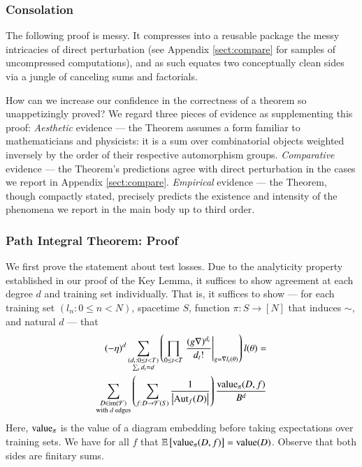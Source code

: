 \documentclass{article}
\newcommand{\Free}{\mathcal{F}}
\newcommand{\Aut}{\text{\textnormal{Aut}}}
\newcommand{\image}{\text{\textnormal{im}}}
\newcommand{\dvalue}{\text{\textnormal{value}}}
\newcommand{\expct}[1]{\mathbb{E}\left[#1\right]}
\newcommand{\wrap}[1]{\left(#1\right)}
\newcommand{\wabs}[1]{\left|#1\right|}
\begin{document}
        \subsubsection*{Consolation}
            The following proof is messy.  It compresses into a reusable
            package the messy intricacies of direct perturbation (see
            Appendix \ref{sect:compare} for samples of uncompressed computations), and as such 
            equates two conceptually clean sides via a jungle of canceling
            sums and factorials.  

            How can we increase our confidence in the correctness of a theorem
            so unappetizingly proved?  We regard three pieces of evidence as
            supplementing this proof: \emph{Aesthetic} evidence --- the Theorem
            assumes a form familiar to mathematicians and physicists: it is a
            sum over combinatorial objects weighted inversely by the order of
            their respective automorphism groups.  \emph{Comparative}
            evidence --- the Theorem's predictions agree with direct
            perturbation in the cases we report in Appendix \ref{sect:compare}.
            \emph{Empirical} evidence --- the Theorem, though compactly stated,
            precisely predicts the existence and intensity of the phenomena we
            report in the main body up to third order.
 
        \subsubsection*{Path Integral Theorem: Proof}
            We first prove the statement about test losses.
            Due to the analyticity property established in our proof of the
            Key Lemma, it suffices to show agreement at each degree $d$ and
            training set individually.  That is, it suffices to show --- for
            each training set $(l_n: 0\leq n<N)$, spacetime $S$, function $\pi:
            S\to [N]$ that induces $\sim$, and natural $d$ --- that
            \begin{align} \label{eq:toprove}
                (-\eta)^d
                \sum_{\substack{
                    (d_t: 0\leq t<T) \\
                    \sum_t d_t = d
                }}
                \wrap{
                    \prod_{0 \leq t < T} \left.
                        \frac{(g \nabla)^{d_t}}{d_t!}
                    \right|_{g=\nabla l_t(\theta)}
                } l (\theta)
                = \nonumber \\
                \sum_{\substack{
                    D \in \image(\Free) \\
                    \textnormal{with $d$ edges}
                }}
                \wrap{
                    \sum_{f: D\to\Free(S)}
                    \frac{1}{\wabs{\Aut_f(D)}}
                }
                \frac{\dvalue_\pi(D, f)}{B^{d}}
            \end{align}
            Here, $\dvalue_\pi$ is the value of a diagram embedding before
            taking expectations over training sets.  We have for all $f$ that
            $\expct{\dvalue_\pi(D, f)} = \dvalue(D)$.
            Observe that both sides are finitary sums.
\end{document}
